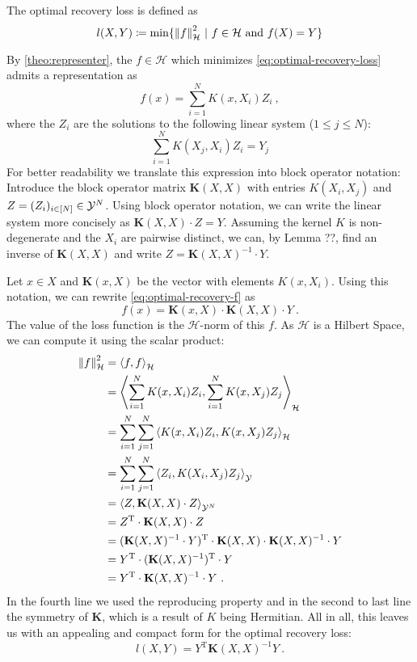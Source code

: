 The optimal recovery loss is defined as
\begin{equation}
	\label{eq:optimal-recovery-loss}
	l(X, Y) \coloneqq \min\{\norm{f}_\mathcal{H}^2 ~|~ f\in \mathcal{H} \text{~and~} f(X) = Y\}
\end{equation}

By \cref{theo:representer}, the $f \in \mathcal{H}$ which minimizes \cref{eq:optimal-recovery-loss} admits a representation as 
\begin{equation}
	\label{eq:optimal-recovery-f}
	f(x) = \sum_{i=1}^N K(x, X_i) Z_i \ ,
\end{equation}
where the $Z_i$ are the solutions to the following linear system ($1 \leq j \leq N$):
\begin{equation}
	\sum_{i=1}^{N} K(X_j, X_i) Z_i = Y_j
\end{equation}
For better readability we translate this expression into block operator notation:
Introduce the block operator matrix $\mathbf{K}(X, X)$ with entries $K(X_i, X_j)$ and $Z = (Z_i)_{i \in [N]} \in \mathcal{Y}^N$.
Using block operator notation, we can write the linear system more concisely as $\mathbf{K}(X, X) \cdot Z = Y$.
Assuming the kernel $K$ is non-degenerate and the $X_i$ are pairwise distinct, we can, by Lemma ??, find an inverse of $\mathbf{K}(X, X)$ and write $Z = \mathbf{K}(X, X)^{-1} \cdot Y$.

Let $x \in X$ and $\mathbf{K}(x, X)$ be the vector with elements $K(x, X_i)$.
Using this notation, we can rewrite \cref{eq:optimal-recovery-f} as
\begin{equation}
	f(x) = \mathbf{K}(x, X) \cdot \mathbf{K}(X, X) \cdot Y \ .
\end{equation}
The value of the loss function is the $\mathcal{H}$-norm of this $f$.
As $\mathcal{H}$ is a Hilbert Space, we can compute it using the scalar product:
\begin{align}
	\norm{f}_\mathcal{H}^2 &= \left< f, f\right>_\mathcal{H}\\
	&= \left< \sum_{i=1}^N K(x, X_i) Z_i, \sum_{i=1}^N K(x, X_j) Z_j \right>_\mathcal{H}\\
	&= \sum_{i=1}^N \sum_{j=1}^N \left< K(x, X_i) Z_i, K(x, X_j) Z_j \right>_\mathcal{H}\\
	&= \sum_{i=1}^N \sum_{j=1}^N \left< Z_i, K(X_i, X_j) Z_j \right>_{\mathcal{Y}}\\
	&= \left< Z, \mathbf{K}(X, X) \cdot Z\right >_{\mathcal{Y}^N}\\
	&= Z^\mathrm{T} \cdot \mathbf{K}(X, X) \cdot Z \\
	&= (\mathbf{K}(X, X)^{-1} \cdot Y)^\mathrm{T} \cdot \mathbf{K}(X, X) \cdot \mathbf{K}(X, X)^{-1} \cdot Y\\
	&= Y^\mathrm{T} \cdot (\mathbf{K}(X, X)^{-1})^\mathrm{T} \cdot Y\\
	&=  Y^\mathrm{T} \cdot \mathbf{K}(X, X)^{-1} \cdot Y \ .
\end{align}
In the fourth line we used the reproducing property and in the second to last line the symmetry of $\mathbf{K}$, which is a result of $K$ being Hermitian.
All in all, this leaves us with an appealing and compact form for the optimal recovery loss:
\begin{equation}
	l(X, Y) = Y^\mathrm{T} \mathbf{K}(X, X)^{-1} Y \ .
\end{equation}
